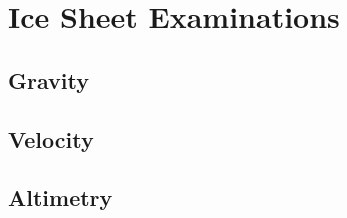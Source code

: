 \section{Ice Sheet Examinations}

\subsection{Gravity}

\subsection{Velocity}

\subsection{Altimetry}